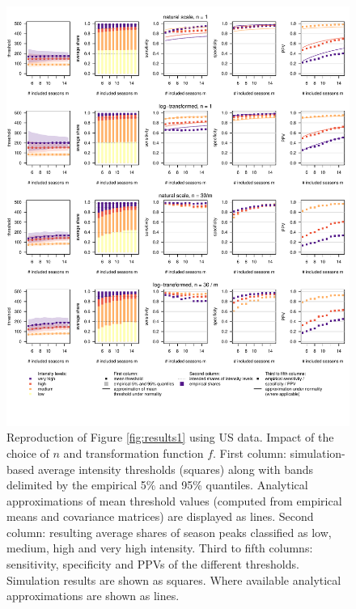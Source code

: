 \documentclass{article}
\begin{document}
\begin{figure}[h!]
\centering
\includegraphics[width=1\textwidth]{figure/plot_us.pdf}

\vspace{-1.5cm}

\caption{Reproduction of Figure \ref{fig:results1} using US data. Impact of the choice of $n$ and transformation function $f$. First column: simulation-based average intensity thresholds (squares) along with bands delimited by the empirical 5\% and 95\% quantiles. Analytical approximations of mean threshold values (computed from empirical means and covariance matrices) are displayed as lines. Second column: resulting average shares of season peaks classified as low, medium, high and very high intensity. Third to fifth columns: sensitivity, specificity and PPVs of the different thresholds. Simulation results are shown as squares. Where available analytical approximations are shown as lines.}
\label{fig:results1_us}
\end{figure}
\end{document}
